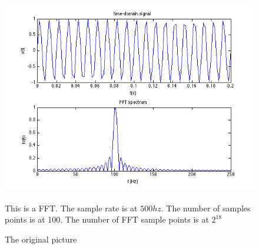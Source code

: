 \documentclass[11pt]{article}
\begin{document}
\FloatBarrier
\begin{figure}[h!]
\includegraphics[scale=0.75]{original.png}
\caption{The original picture}

\label{img:original}
\begin{minipage}{0.75\textwidth}
{\footnotesize This is a FFT. The sample rate is at $500hz$. The number of samples points is at 100. The number of FFT sample points is at $2^{18}$}
\end{minipage}
\end{figure}
\FloatBarrier
\end{document}
